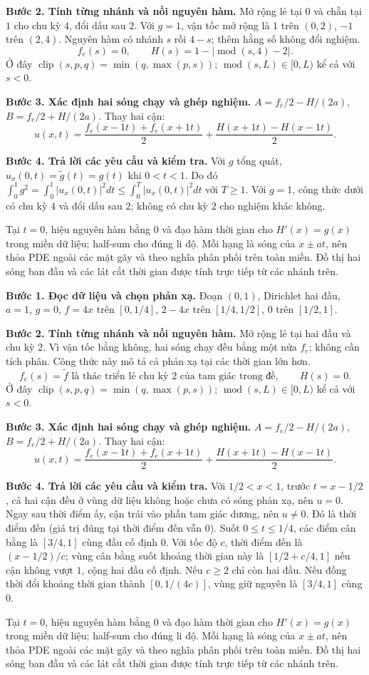 \textbf{Bước 2. Tính từng nhánh và nối nguyên hàm.} Mở rộng lẻ tại $0$ và chẵn tại $1$ cho chu kỳ $4$, đổi dấu sau $2$. Với $g=1$, vận tốc mở rộng là $1$ trên $(0,2)$, $-1$ trên $(2,4)$. Nguyên hàm có nhánh $s$ rồi $4-s$; thêm hằng số không đổi nghiệm.
\[f_e(s)=0,\qquad H(s)=1-|\operatorname{mod}(s,4)-2|.\]
Ở đây $\operatorname{clip}(s,p,q)=\min(q,\max(p,s))$; $\operatorname{mod}(s,L)\in[0,L)$ kể cả với $s<0$.

\textbf{Bước 3. Xác định hai sóng chạy và ghép nghiệm.} $A=f_e/2-H/(2a)$, $B=f_e/2+H/(2a)$. Thay hai cận:
\[u(x,t)=\frac{f_e(x-1t)+f_e(x+1t)}2+\frac{H(x+1t)-H(x-1t)}{2}.\]

\textbf{Bước 4. Trả lời các yêu cầu và kiểm tra.} Với $g$ tổng quát, $u_x(0,t)=\widetilde g(t)=g(t)$ khi $0<t<1$. Do đó $\int_0^1g^2=\int_0^1|u_x(0,t)|^2dt\le\int_0^T|u_x(0,t)|^2dt$ với $T\ge1$. Với $g=1$, công thức dưới có chu kỳ $4$ và đổi dấu sau $2$; không có chu kỳ $2$ cho nghiệm khác không.

Tại $t=0$, hiệu nguyên hàm bằng $0$ và đạo hàm thời gian cho $H'(x)=g(x)$ trong miền dữ liệu; half-sum cho đúng li độ. Mỗi hạng là sóng của $x\pm at$, nên thỏa PDE ngoài các mặt gãy và theo nghĩa phân phối trên toàn miền. Đồ thị hai sóng ban đầu và các lát cắt thời gian được tính trực tiếp từ các nhánh trên.

\textbf{Bước 1. Đọc dữ liệu và chọn phản xạ.} Đoạn $(0,1)$, Dirichlet hai đầu, $a=1$, $g=0$, $f=4x$ trên $[0,1/4]$, $2-4x$ trên $[1/4,1/2]$, $0$ trên $[1/2,1]$.

\textbf{Bước 2. Tính từng nhánh và nối nguyên hàm.} Mở rộng lẻ tại hai đầu và chu kỳ $2$. Vì vận tốc bằng không, hai sóng chạy đều bằng một nửa $f_e$; không cần tích phân. Công thức này mô tả cả phản xạ tại các thời gian lớn hơn.
\[f_e(s)=\widetilde f\text{ là thác triển lẻ chu kỳ }2\text{ của tam giác trong đề},\qquad H(s)=0.\]
Ở đây $\operatorname{clip}(s,p,q)=\min(q,\max(p,s))$; $\operatorname{mod}(s,L)\in[0,L)$ kể cả với $s<0$.

\textbf{Bước 3. Xác định hai sóng chạy và ghép nghiệm.} $A=f_e/2-H/(2a)$, $B=f_e/2+H/(2a)$. Thay hai cận:
\[u(x,t)=\frac{f_e(x-1t)+f_e(x+1t)}2+\frac{H(x+1t)-H(x-1t)}{2}.\]

\textbf{Bước 4. Trả lời các yêu cầu và kiểm tra.} Với $1/2<x<1$, trước $t=x-1/2$, cả hai cận đều ở vùng dữ liệu không hoặc chưa có sóng phản xạ, nên $u=0$. Ngay sau thời điểm ấy, cận trái vào phần tam giác dương, nên $u\ne0$. Đó là thời điểm đến (giá trị đúng tại thời điểm đến vẫn $0$). Suốt $0\le t\le1/4$, các điểm cân bằng là $[3/4,1]$ cùng đầu cố định $0$. Với tốc độ $c$, thời điểm đến là $(x-1/2)/c$; vùng cân bằng suốt khoảng thời gian này là $[1/2+c/4,1]$ nếu cận không vượt $1$, cộng hai đầu cố định. Nếu $c\ge2$ chỉ còn hai đầu. Nếu đồng thời đổi khoảng thời gian thành $[0,1/(4c)]$, vùng giữ nguyên là $[3/4,1]$ cùng $0$.

Tại $t=0$, hiệu nguyên hàm bằng $0$ và đạo hàm thời gian cho $H'(x)=g(x)$ trong miền dữ liệu; half-sum cho đúng li độ. Mỗi hạng là sóng của $x\pm at$, nên thỏa PDE ngoài các mặt gãy và theo nghĩa phân phối trên toàn miền. Đồ thị hai sóng ban đầu và các lát cắt thời gian được tính trực tiếp từ các nhánh trên.
